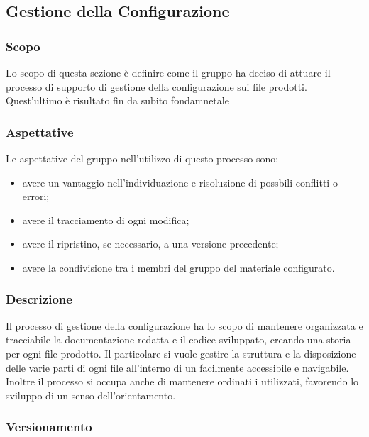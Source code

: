 \subsection{Gestione della Configurazione}
\subsubsection{Scopo}
Lo scopo di questa sezione è definire come il gruppo ha deciso di attuare il processo di supporto di gestione della configurazione sui file prodotti.
Quest'ultimo è risultato fin da subito fondamnetale 

\subsubsection{Aspettative}
Le aspettative del gruppo \Gruppo{} nell'utilizzo di questo processo sono:
\begin{itemize}
	\item avere un vantaggio nell'individuazione e risoluzione di possbili conflitti o errori;
	\item avere il tracciamento di ogni modifica;
	\item avere il ripristino, se necessario, a una versione precedente;
	\item avere la condivisione tra i membri del gruppo del materiale configurato.
\end{itemize}

\subsubsection{Descrizione}
Il processo di gestione della configurazione ha lo scopo di mantenere organizzata e tracciabile la documentazione redatta e il codice sviluppato, creando una storia per ogni file prodotto. Il particolare si vuole gestire la struttura e la disposizione delle varie parti di ogni file all'interno di un  facilmente accessibile e navigabile.
Inoltre il processo si occupa anche di mantenere ordinati i  utilizzati, favorendo lo sviluppo di un senso dell'orientamento.

\subsubsection{Versionamento}
